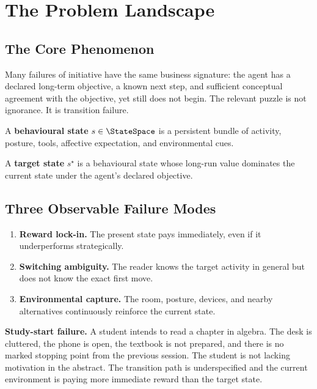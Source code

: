 \section{The Problem Landscape}
\label{sec:landscape}

\subsection{The Core Phenomenon}

Many failures of initiative have the same business signature: the agent has a
declared long-term objective, a known next step, and sufficient conceptual
agreement with the objective, yet still does not begin. The relevant puzzle is
not ignorance. It is transition failure.

\begin{definition}
A \textbf{behavioural state} $s \in \StateSpace$ is a persistent bundle of
activity, posture, tools, affective expectation, and environmental cues.
\end{definition}

\begin{definition}
A \textbf{target state} $s^\star$ is a behavioural state whose long-run value
dominates the current state under the agent's declared objective.
\end{definition}

\subsection{Three Observable Failure Modes}

\begin{enumerate}
  \item \textbf{Reward lock-in.} The present state pays immediately, even if it
        underperforms strategically.
  \item \textbf{Switching ambiguity.} The reader knows the target activity in
        general but does not know the exact first move.
  \item \textbf{Environmental capture.} The room, posture, devices, and nearby
        alternatives continuously reinforce the current state.
\end{enumerate}

\begin{examplebox}
\textbf{Study-start failure.} A student intends to read a chapter in algebra.
The desk is cluttered, the phone is open, the textbook is not prepared, and
there is no marked stopping point from the previous session. The student is not
lacking motivation in the abstract. The transition path is underspecified and
the current environment is paying more immediate reward than the target state.
\end{examplebox}

